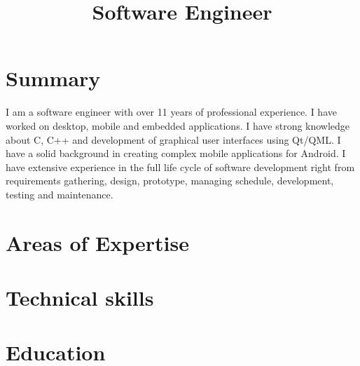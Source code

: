 \documentclass[10pt,a4paper,sans]{moderncv} %
\title{Software Engineer}
\begin{document}
\makecvtitle %


\section{Summary}

I am a software engineer with over 11 years of professional experience. I have worked on desktop, mobile and embedded applications. I have strong knowledge about C, C++ and development of graphical user interfaces using Qt/QML. I have a solid background in creating complex mobile applications for Android. I have extensive experience in the full life cycle of software development right from requirements gathering, design, prototype, managing schedule, development, testing and maintenance.

\section{Areas of Expertise}


\section{Technical skills}


\section{Education}


\end{document}
